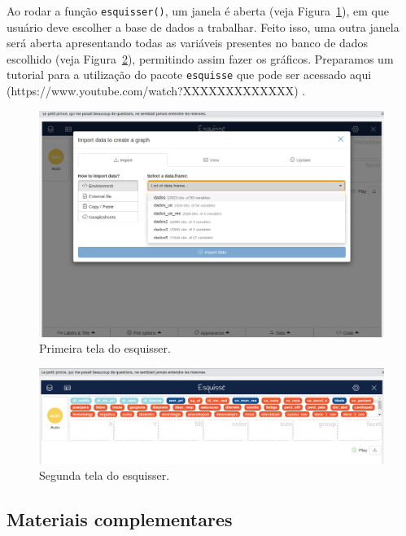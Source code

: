 \documentclass[
  letterpaper,
  DIV=11,
  numbers=noendperiod]{scrreprt}
\begin{document}
Ao rodar a função \texttt{esquisser()}, um janela é aberta (veja
Figura~\ref{fig-Eq1}), em que usuário deve escolher a base de dados a
trabalhar. Feito isso, uma outra janela será aberta apresentando todas
as variáveis presentes no banco de dados escolhido (veja
Figura~\ref{fig-Eq2}), permitindo assim fazer os gráficos. Preparamos um
tutorial para a utilização do pacote \texttt{esquisse} que pode ser
acessado aqui {(https://www.youtube.com/watch?XXXXXXXXXXXXX)} .

\begin{figure}

{\centering \includegraphics{./figuras_descritiva/Esquisser_1.png}

}

\caption{\label{fig-Eq1}Primeira tela do esquisser.}

\end{figure}

\begin{figure}

{\centering \includegraphics{./figuras_descritiva/Esquisser_2.png}

}

\caption{\label{fig-Eq2}Segunda tela do esquisser.}

\end{figure}

\hypertarget{materiais-complementares}{%
\subsection{Materiais complementares}\label{materiais-complementares}}
\end{document}
